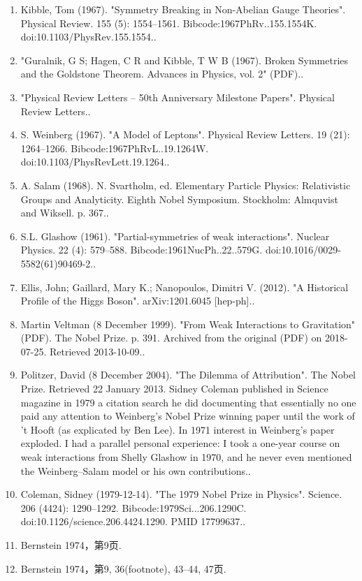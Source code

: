 \begin{enumerate}
    \item Kibble, Tom (1967). "Symmetry Breaking in Non-Abelian Gauge Theories". Physical Review. 155 (5): 1554–1561. Bibcode:1967PhRv..155.1554K. doi:10.1103/PhysRev.155.1554..
    \item "Guralnik, G S; Hagen, C R and Kibble, T W B (1967). Broken Symmetries and the Goldstone Theorem. Advances in Physics, vol. 2" (PDF)..
    \item "Physical Review Letters – 50th Anniversary Milestone Papers". Physical Review Letters..
    \item S. Weinberg (1967). "A Model of Leptons". Physical Review Letters. 19 (21): 1264–1266. Bibcode:1967PhRvL..19.1264W. doi:10.1103/PhysRevLett.19.1264..
    \item A. Salam (1968). N. Svartholm, ed. Elementary Particle Physics: Relativistic Groups and Analyticity. Eighth Nobel Symposium. Stockholm: Almquvist and Wiksell. p. 367..
    \item S.L. Glashow (1961). "Partial-symmetries of weak interactions". Nuclear Physics. 22 (4): 579–588. Bibcode:1961NucPh..22..579G. doi:10.1016/0029-5582(61)90469-2..
    \item Ellis, John; Gaillard, Mary K.; Nanopoulos, Dimitri V. (2012). "A Historical Profile of the Higgs Boson". arXiv:1201.6045 [hep-ph]..
    \item Martin Veltman (8 December 1999). "From Weak Interactions to Gravitation" (PDF). The Nobel Prize. p. 391. Archived from the original (PDF) on 2018-07-25. Retrieved 2013-10-09..
    \item Politzer, David (8 December 2004). "The Dilemma of Attribution". The Nobel Prize. Retrieved 22 January 2013. Sidney Coleman published in Science magazine in 1979 a citation search he did documenting that essentially no one paid any attention to Weinberg’s Nobel Prize winning paper until the work of ’t Hooft (as explicated by Ben Lee). In 1971 interest in Weinberg’s paper exploded. I had a parallel personal experience: I took a one-year course on weak interactions from Shelly Glashow in 1970, and he never even mentioned the Weinberg–Salam model or his own contributions..
    \item Coleman, Sidney (1979-12-14). "The 1979 Nobel Prize in Physics". Science. 206 (4424): 1290–1292. Bibcode:1979Sci...206.1290C. doi:10.1126/science.206.4424.1290. PMID 17799637..
    \item Bernstein 1974，第9页.
    \item Bernstein 1974，第9, 36(footnote), 43–44, 47页.

\end{enumerate}
